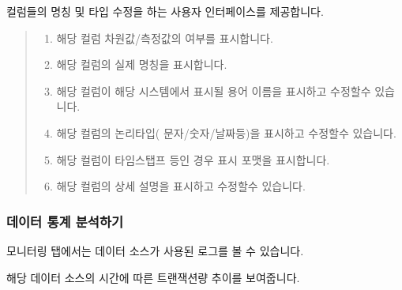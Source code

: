 \documentclass[letterpaper,10pt,english]{sphinxmanual}
\begin{document}
컬럼들의 명칭 및 타입 수정을 하는 사용자 인터페이스를 제공합니다.
\begin{quote}

\begin{figure}[H]
\centering

\noindent{}
\end{figure}
\begin{enumerate}
\def\theenumi{\arabic{enumi}}
\def\labelenumi{\theenumi .}
\makeatletter\def\p@enumii{\p@enumi \theenumi .}\makeatother
\item {} 
 해당 컬럼 차원값/측정값의 여부를 표시합니다.

\item {} 
 해당 컬럼의 실제 명칭을 표시합니다.

\item {} 
 해당 컬럼이 해당 시스템에서 표시될 용어 이름을 표시하고 수정할수 있습니다.

\item {} 
 해당 컬럼의 논리타입( 문자/숫자/날짜등)을 표시하고 수정할수 있습니다.

\item {} 
 해당 컬럼이 타임스탭프 등인 경우 표시 포맷을 표시합니다.

\item {} 
 해당 컬럼의 상세 설명을 표시하고 수정할수 있습니다.

\end{enumerate}
\end{quote}


\subsubsection{데이터 통계 분석하기}
\label{\detokenize{discovery/part02/data_source_detail_view:id5}}
모니터링 탭에서는 데이터 소스가 사용된 로그를 볼 수 있습니다.


해당 데이터 소스의 시간에 따른 트랜잭션량 추이를 보여줍니다.
\begin{quote}

\begin{figure}[H]
\centering

\noindent{}
\end{figure}
\end{quote}
\end{document}
